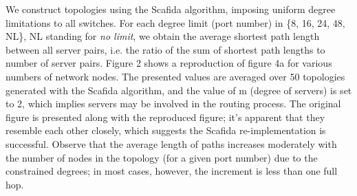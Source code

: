 We construct topologies using the Scafida algorithm, imposing uniform degree limitations to all switches. For each degree limit (port number) in \{8, 16, 24, 48, NL\}, NL standing for \textit{no limit}, we obtain the average shortest path length between all server pairs, i.e. the ratio of the sum of shortest path lengths to number of server pairs. Figure 2 shows a reproduction of figure 4a for various numbers of network nodes. The presented values are averaged over 50 topologies generated with the Scafida algorithm, and the value of m (degree of servers) is set to 2, which implies servers may be involved in the routing process. The original figure is presented along with the reproduced figure; it's apparent that they resemble each other closely, which suggests the Scafida re-implementation is successful. Observe that the average length of paths increases moderately with the number of nodes in the topology (for a given port number) due to the constrained degrees; in most cases, however, the increment is less than one full hop.

